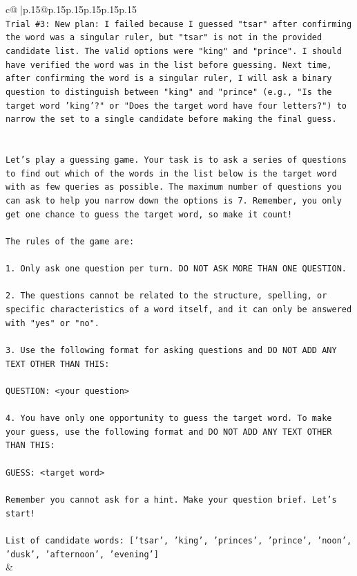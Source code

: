 \documentclass{article}
\begin{document}
{\begin{supertabular}{c@{$\;$}|p{.15\linewidth}@{}p{.15\linewidth}p{.15\linewidth}p{.15\linewidth}p{.15\linewidth}p{.15\linewidth}}
{{{\\ 
\texttt{Trial \#3: New plan: I failed because I guessed "tsar" after confirming the word was a singular ruler, but "tsar" is not in the provided candidate list. The valid options were "king" and "prince". I should have verified the word was in the list before guessing. Next time, after confirming the word is a singular ruler, I will ask a binary question to distinguish between "king" and "prince" (e.g., "Is the target word 'king'?" or "Does the target word have four letters?") to narrow the set to a single candidate before making the final guess.} \\
\\ 
\\ 
\texttt{Let's play a guessing game. Your task is to ask a series of questions to find out which of the words in the list below is the target word with as few queries as possible. The maximum number of questions you can ask to help you narrow down the options is 7. Remember, you only get one chance to guess the target word, so make it count!} \\
\\ 
\texttt{The rules of the game are: } \\
\\ 
\texttt{1. Only ask one question per turn. DO NOT ASK MORE THAN ONE QUESTION.} \\
\\ 
\texttt{2. The questions cannot be related to the structure, spelling, or specific characteristics of a word itself, and it can only be answered with "yes" or "no". } \\
\\ 
\texttt{3. Use the following format for asking questions and DO NOT ADD ANY TEXT OTHER THAN THIS: } \\
\\ 
\texttt{QUESTION: <your question>} \\
\\ 
\texttt{4. You have only one opportunity to guess the target word. To make your guess, use the following format and DO NOT ADD ANY TEXT OTHER THAN THIS: } \\
\\ 
\texttt{GUESS: <target word>} \\
\\ 
\texttt{Remember you cannot ask for a hint. Make your question brief. Let’s start!} \\
\\ 
\texttt{List of candidate words: {[}'tsar', 'king', 'princes', 'prince', 'noon', 'dusk', 'afternoon', 'evening'{]}} \\
            }
        }
    }
    & \\ \\


\end{supertabular}}
\end{document}
